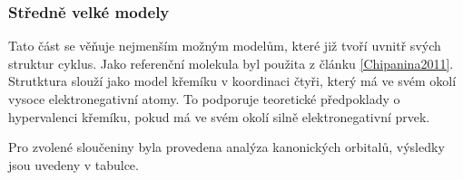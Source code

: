 \documentclass[
  digital, %
  table,   %
  lof,     %
  lot,     %
]{fithesis3}
\begin{document}
\subsubsection{Středně velké modely}
Tato část se věňuje nejmenším možným modelům, které již tvoří uvnitř svých struktur cyklus. Jako referenční molekula byl použita  z článku \ref{Chipanina2011}. Strutktura  slouží jako model křemíku v koordinaci čtyři, který má ve svém okolí vysoce elektronegativní atomy. To podporuje teoretické předpoklady o hypervalenci křemíku, pokud má ve svém okolí silně elektronegativní prvek.
\begin{figure}
\begin{center}
\caption{}

\label{obr_h4sio4_vysledky_I}



\end{center}
\end{figure}
Pro zvolené sloučeniny byla provedena analýza kanonických orbitalů, výsledky jsou uvedeny v tabulce.
\end{document}
